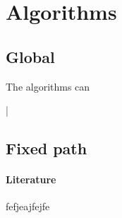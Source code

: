 \documentclass[conference,a4paper]{IEEEtran}
\begin{document}
\section{Algorithms}
\subsection{Global}
The algorithms can 

\newpage
|
\newpage

\subsection{Fixed path}



\paragraph{Literature} fefjeajfejfe

\end{document}
